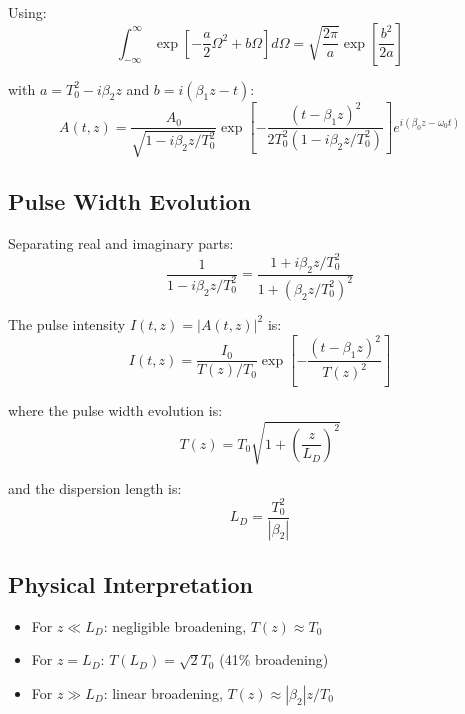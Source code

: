 \documentclass[12pt,a4paper]{article}
\begin{document}
Using:
\begin{equation}
\int_{-\infty}^{\infty} \exp\left[-\frac{a}{2}\Omega^2 + b\Omega\right] d\Omega = \sqrt{\frac{2\pi}{a}} \exp\left[\frac{b^2}{2a}\right]
\end{equation}

with $a = T_0^2 - i\beta_2 z$ and $b = i(\beta_1 z - t)$:
\begin{equation}
A(t, z) = \frac{A_0}{\sqrt{1 - i\beta_2 z/T_0^2}} \exp\left[-\frac{(t - \beta_1 z)^2}{2T_0^2(1 - i\beta_2 z/T_0^2)}\right] e^{i(\beta_0 z - \omega_0 t)}
\end{equation}

\subsection{Pulse Width Evolution}

Separating real and imaginary parts:
\begin{equation}
\frac{1}{1 - i\beta_2 z/T_0^2} = \frac{1 + i\beta_2 z/T_0^2}{1 + (\beta_2 z/T_0^2)^2}
\end{equation}

The pulse intensity $I(t, z) = |A(t, z)|^2$ is:
\begin{equation}
I(t, z) = \frac{I_0}{T(z)/T_0} \exp\left[-\frac{(t - \beta_1 z)^2}{T(z)^2}\right] \label{eq:gaussian_output}
\end{equation}

where the pulse width evolution is:
\begin{equation}
T(z) = T_0 \sqrt{1 + \left(\frac{z}{L_D}\right)^2} \label{eq:pulse_width}
\end{equation}

and the dispersion length is:
\begin{equation}
L_D = \frac{T_0^2}{|\beta_2|} \label{eq:dispersion_length}
\end{equation}

\subsection{Physical Interpretation}

\begin{itemize}[leftmargin=*]
\item For $z \ll L_D$: negligible broadening, $T(z) \approx T_0$
\item For $z = L_D$: $T(L_D) = \sqrt{2} T_0$ (41\% broadening)
\item For $z \gg L_D$: linear broadening, $T(z) \approx |\beta_2|z/T_0$
\end{itemize}
\end{document}
